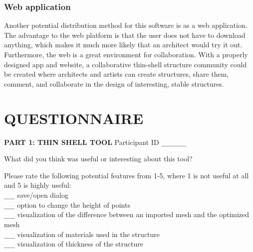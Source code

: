 \documentclass{thesis}
\begin{document}
\subsection{Web application}
Another potential distribution method for this software is as a web application.  The advantage to the web platform is that the
user does not have to download anything, which makes it much more likely that an architect would try it out.  Furthermore, the
web is a great environment for collaboration.  With a properly designed app and website, a collaborative thin-shell structure
community could be created where architects and artists can create structures, share them, comment, and collaborate in the
design of interesting, stable structures.


\begin{singlespace}


\end{singlespace}

\appendix    %
\chapter{QUESTIONNAIRE}
\setlength{\parindent}{0in} 
{\bf PART 1: THIN SHELL TOOL} 
\hfill Participant ID \verb+_______+
\vspace{0.3in}

What did you think was useful or interesting about this tool?
\vspace{1.1in}

Please rate the following potential features from 1-5, where 1 is not useful at all and 5 is highly useful: \\

\verb+___+ save/open dialog\\
\verb+___+ option to change the height of points\\
\verb+___+ visualization of the difference between an imported mesh and the optimized mesh\\
\verb+___+ visualization of materials used in the structure\\
\verb+___+ visualization of thickness of the structure


\vspace{0.3in}
\end{document}
